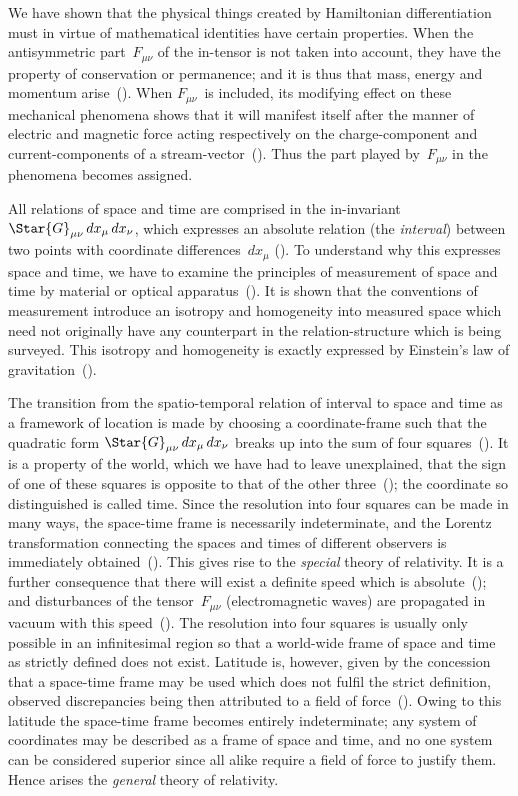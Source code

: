 \documentclass[12pt]{book}
\begin{document}
We have shown that the physical things created by Hamiltonian differentiation
%
%
must in virtue of mathematical identities have certain properties. When
the antisymmetric part~$F_{\mu\nu}$ of the in\hyp{}tensor is not taken into account, they
have the property of conservation or permanence; and it is thus that mass,
energy and momentum arise~(). When $F_{\mu\nu}$~is included, its modifying effect
on these mechanical phenomena shows that it will manifest itself after the
manner of electric and magnetic force acting respectively on the charge\hyp{}component
and current\hyp{}components of a stream\hyp{}vector~(). Thus the part played
by~$F_{\mu\nu}$ in the phenomena becomes assigned.

All relations of space and time are comprised in the in\hyp{}invariant $\Star{G}_{\mu\nu}\, dx_{\mu}\, dx_{\nu}$,
which expresses an absolute relation (the \emph{interval}) between two points with
coordinate differences~$dx_{\mu}$ (). To understand why this expresses space and
time, we have to examine the principles of measurement of space and time by
material or optical apparatus~(). It is shown that the conventions of measurement
introduce an isotropy and homogeneity into measured space which need
not originally have any counterpart in the relation\hyp{}structure which is being
surveyed. This isotropy and homogeneity is exactly expressed by Einstein's
law of gravitation~().

The transition from the spatio\hyp{}temporal relation of interval to space and
time as a framework of location is made by choosing a coordinate\hyp{}frame such
that the quadratic form $\Star{G}_{\mu\nu}\, dx_{\mu}\, dx_{\nu}$ breaks up into the sum of four squares~().
It is a property of the world, which we have had to leave unexplained, that
the sign of one of these squares is opposite to that of the other three~(); the
coordinate so distinguished is called time. Since the resolution into four squares
can be made in many ways, the space-time frame is necessarily indeterminate,
and the Lorentz transformation connecting the spaces and times of different
observers is immediately obtained~(). This gives rise to the \emph{special} theory of
relativity. It is a further consequence that there will exist a definite speed
which is absolute~(); and disturbances of the tensor~$F_{\mu\nu}$  (electromagnetic
waves) are propagated in vacuum with this speed~(). The resolution into
four squares is usually only possible in an infinitesimal region so that a world-wide
frame of space and time as strictly defined does not exist. Latitude is,
however, given by the concession that a space-time frame may be used which
does not fulfil the strict definition, observed discrepancies being then attributed
to a field of force~(). Owing to this latitude the space-time frame becomes
entirely indeterminate; any system of coordinates may be described as a frame
of space and time, and no one system can be considered superior since all alike
require a field of force to justify them. Hence arises the \emph{general} theory of
relativity.
\end{document}
